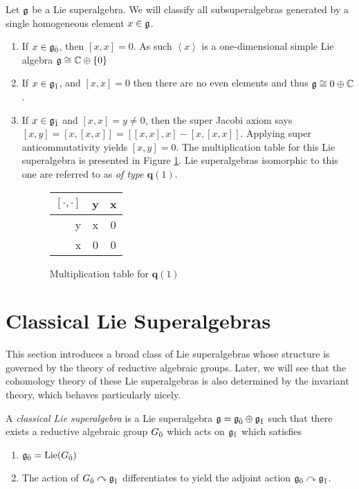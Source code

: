 \begin{example}
  \label{ex:q1}
  Let $\mathfrak{g}$ be a Lie superalgebra. We will classify all subsuperalgebras generated by a single homogeneous element $x \in \mathfrak{g}$.
  \begin{enumerate}
  \item If $x \in {\mathfrak{g}}_{\bar{0}}$, then $[x,x] = 0$. As such $\left<x\right>$ is a one-dimensional simple Lie algebra $\mathfrak{g} \cong \mathbb{C} \oplus \{0\}$
  \item If $x \in {\mathfrak{g}}_{\bar{1}}$, and $[x,x] = 0$ then there are no even elements and thus $\mathfrak{g} \cong 0 \oplus \mathbb{C}$.
  \item \label{ex:q13} If $x \in {\mathfrak{g}}_{\bar{1}}$ and $[x,x] = y \neq 0$, then the super Jacobi axiom says $[x,y] = [x,[x,x]] = [[x,x],x] - [x,[x,x]]$. Applying super anticommutativity yields $[x,y] = 0$. The multiplication table for this Lie superalgebra is presented in Figure \ref{fig:q1-mult}. Lie superalgebras isomorphic to this one are referred to as \emph{of type $\mathbf{q}(1)$}.
    \begin{figure}[h]
      \label{fig:q1-mult}
      \centering
      \begin{tabular}{r|| c | c |}
$[\cdot,\cdot]$ & y & x \\
\hline\hline
        y & x & 0 \\
        x & 0 & 0 \\
\hline
\end{tabular}
      \caption{Multiplication table for $\mathbf{q}(1)$}
    \end{figure}
  \end{enumerate}
\end{example}

\section{Classical Lie Superalgebras}
\label{sec:classical-superalgebras}

This section introduces a broad class of Lie superalgebras whose structure is governed by the theory of reductive algebraic groups. Later, we will see that the cohomology theory of these Lie superalgebras is also determined by the invariant theory, which behaves particularly nicely. 

\begin{definition}
  A \emph{classical Lie superalgebra} is a Lie superalgebra $\mathfrak{g} = {\mathfrak{g}}_{\bar{0}} \oplus {\mathfrak{g}}_{\bar{1}}$ such that there exists a reductive algebraic group ${G}_{\bar{0}}$ which acts on ${\mathfrak{g}}_{\bar{1}}$ which satisfies
  \begin{enumerate}
  \item ${\mathfrak{g}}_{\bar{0}} = \operatorname{Lie}({G}_{\bar{0}})$
  \item The action of ${G}_{\bar{0}} \curvearrowright {\mathfrak{g}}_{\bar{1}}$ differentiates to yield the adjoint action ${\mathfrak{g}}_{\bar{0}} \curvearrowright {\mathfrak{g}}_{\bar{1}}$.
  \end{enumerate}
\end{definition}

